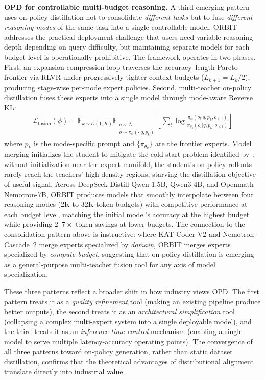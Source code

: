 \documentclass{article} %
\begin{document}
\textbf{OPD for controllable multi-budget reasoning.}
A third emerging pattern uses on-policy distillation not to consolidate \emph{different tasks} but to fuse \emph{different reasoning modes} of the same task into a single controllable model. ORBIT~\citep{liang2026orbit} addresses the practical deployment challenge that users need variable reasoning depth depending on query difficulty, but maintaining separate models for each budget level is operationally prohibitive. The framework operates in two phases. First, an expansion-compression loop traverses the accuracy--length Pareto frontier via RLVR under progressively tighter context budgets ($L_{k+1} = L_k/2$), producing stage-wise per-mode expert policies. Second, multi-teacher on-policy distillation fuses these experts into a single model through mode-aware Reverse KL:
\begin{align}
    \mathcal{L}_{\text{fusion}}(\phi) = \mathbb{E}_{k \sim U(1,K)} \mathbb{E}_{\substack{q \sim \mathcal{D} \\ o \sim \pi_\phi(\cdot|q, p_k)}} \left[ \sum_t \log \frac{\pi_\phi(o_t | q, p_k, o_{<t})}{\pi_{\theta_k}(o_t | q, p_k, o_{<t})} \right]
\end{align}
where $p_k$ is the mode-specific prompt and $\{\pi_{\theta_k}\}$ are the frontier experts. Model merging initializes the student to mitigate the cold-start problem identified by~\citet{2601.07155}: without initialization near the expert manifold, the student's on-policy rollouts rarely reach the teachers' high-density regions, starving the distillation objective of useful signal. Across DeepSeek-Distill-Qwen-1.5B, Qwen3-4B, and Openmath-Nemotron-7B, ORBIT produces models that smoothly interpolate between four reasoning modes (2K to 32K token budgets) with competitive performance at each budget level, matching the initial model's accuracy at the highest budget while providing $2$--$7\times$ token savings at lower budgets. The connection to the consolidation pattern above is instructive: where KAT-Coder-V2 and Nemotron-Cascade~2 merge experts specialized by \emph{domain}, ORBIT merges experts specialized by \emph{compute budget}, suggesting that on-policy distillation is emerging as a general-purpose multi-teacher fusion tool for any axis of model specialization.

These three patterns reflect a broader shift in how industry views OPD. The first pattern treats it as a \emph{quality refinement} tool (making an existing pipeline produce better outputs), the second treats it as an \emph{architectural simplification} tool (collapsing a complex multi-expert system into a single deployable model), and the third treats it as an \emph{inference-time control} mechanism (enabling a single model to serve multiple latency-accuracy operating points). The convergence of all three patterns toward on-policy generation, rather than static dataset distillation, confirms that the theoretical advantages of distributional alignment translate directly into industrial value.
\end{document}
